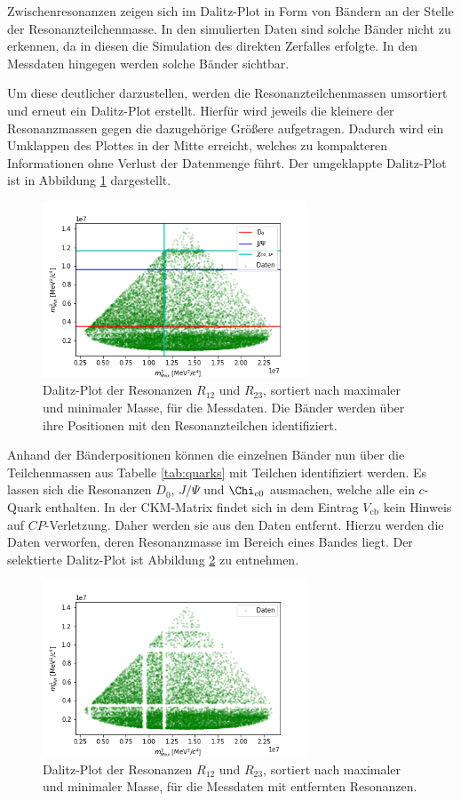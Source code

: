 \FloatBarrier
Zwischenresonanzen zeigen sich im Dalitz-Plot in Form von Bändern an der Stelle der Resonanzteilchenmasse. In den simulierten Daten sind solche Bänder nicht zu erkennen, da in diesen die Simulation des direkten Zerfalles erfolgte. In den Messdaten hingegen werden solche Bänder sichtbar.

Um diese deutlicher darzustellen, werden die Resonanzteilchenmassen umsortiert und erneut ein Dalitz-Plot erstellt. Hierfür wird jeweils die kleinere der Resonanzmassen gegen die dazugehörige Größere aufgetragen. Dadurch wird ein Umklappen des Plottes in der Mitte erreicht, welches zu kompakteren Informationen ohne Verlust der Datenmenge führt. Der umgeklappte Dalitz-Plot ist in Abbildung \ref{fig:Dalitz_klapp} dargestellt.
\begin{figure}
  \centering
  \includegraphics[width=0.7\textwidth]{plots/dalitz_real_MinMax.png}
  \caption{Dalitz-Plot der Resonanzen $R_{12}$ und $R_{23}$, sortiert nach maximaler und minimaler Masse, für die Messdaten. Die Bänder werden über ihre Positionen mit den Resonanzteilchen identifiziert.}
  \label{fig:Dalitz_klapp}
\end{figure}
\FloatBarrier
Anhand der Bänderpositionen können die einzelnen Bänder nun über die Teilchenmassen aus Tabelle \ref{tab:quarks} mit Teilchen identifiziert werden. Es lassen sich die Resonanzen $D_0$, $J/\Psi$ und $\Chi_{c0}$ ausmachen, welche alle ein $c$-Quark enthalten.
In der CKM-Matrix findet sich in dem Eintrag $V_{\mathrm{cb}}$ kein Hinweis auf $CP$-Verletzung.
Daher werden sie aus den Daten entfernt. Hierzu werden die Daten verworfen, deren Resonanzmasse im Bereich eines Bandes liegt. Der selektierte Dalitz-Plot ist Abbildung \ref{fig:Dalitz_sel} zu entnehmen.
\begin{figure}
  \centering
  \includegraphics[width=0.7\textwidth]{plots/dalitz_real_MinMax_ohnec.png}
  \caption{Dalitz-Plot der Resonanzen $R_{12}$ und $R_{23}$, sortiert nach maximaler und minimaler Masse, für die Messdaten mit entfernten Resonanzen.}
  \label{fig:Dalitz_sel}
\end{figure}
